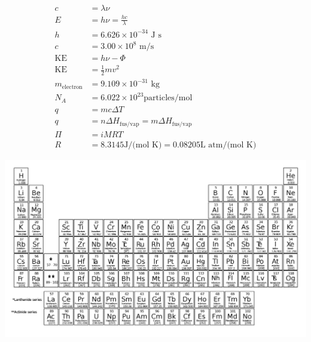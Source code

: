 \documentclass[12pt]{exam}		%
\begin{document}
\begin{align*}
  c & = \lambda \nu \\
  E & = h\nu = \frac{hc}{\lambda} \\
  h & = 6.626 \times 10^{-34} \text{ J s} \\
  c & = 3.00 \times 10^{8} \text{ m/s} \\
  \text{KE} & = h\nu - \Phi \\
  \text{KE} & = \frac{1}{2} mv^2 \\
  m_\text{electron} & = 9.109 \times 10^{-31} \text{ kg} \\
  N_A & = 6.022 \times 10^{23} \text{particles/mol} \\
  q & = mc\Delta T \\
  q & = n\Delta H_\text{fus/vap} = m\Delta H_\text{fus/vap} \\
  \Pi & = iMRT \\
  R & = 8.3145 \text{J/(mol K)} = 0.08205 \text{L atm/(mol K)}
\end{align*}

\begin{center}
  \includegraphics[scale=0.26,angle=90]{periodic_table}
\end{center}
\end{document}
